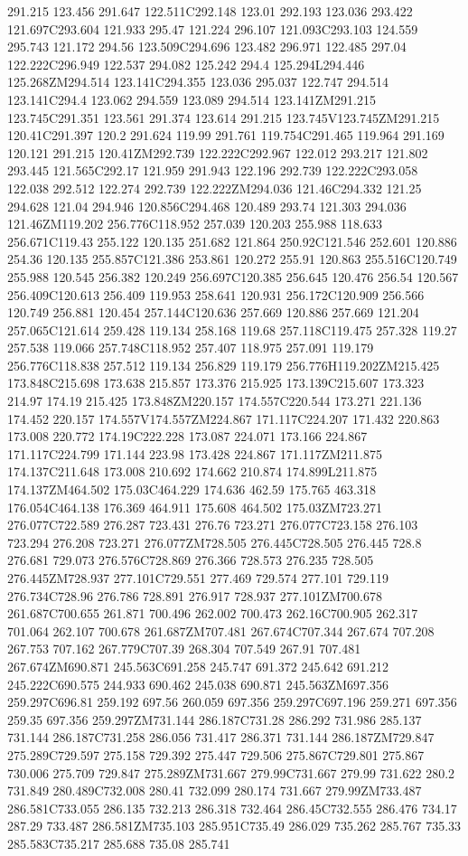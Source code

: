 291.215 123.456 291.647 122.511C292.148 123.01 292.193 123.036 293.422 121.697C293.604 121.933 295.47 121.224 296.107 121.093C293.103 124.559 295.743 121.172 294.56 123.509C294.696 123.482 296.971 122.485 297.04 122.222C296.949 122.537 294.082 125.242 294.4 125.294L294.446 125.268ZM294.514 123.141C294.355 123.036 295.037 122.747 294.514 123.141C294.4 123.062 294.559 123.089 294.514 123.141ZM291.215 123.745C291.351 123.561 291.374 123.614 291.215 123.745V123.745ZM291.215 120.41C291.397 120.2 291.624 119.99 291.761 119.754C291.465 119.964 291.169 120.121 291.215 120.41ZM292.739 122.222C292.967 122.012 293.217 121.802 293.445 121.565C292.17 121.959 291.943 122.196 292.739 122.222C293.058 122.038 292.512 122.274 292.739 122.222ZM294.036 121.46C294.332 121.25 294.628 121.04 294.946 120.856C294.468 120.489 293.74 121.303 294.036 121.46ZM119.202 256.776C118.952 257.039 120.203 255.988 118.633 256.671C119.43 255.122 120.135 251.682 121.864 250.92C121.546 252.601 120.886 254.36 120.135 255.857C121.386 253.861 120.272 255.91 120.863 255.516C120.749 255.988 120.545 256.382 120.249 256.697C120.385 256.645 120.476 256.54 120.567 256.409C120.613 256.409 119.953 258.641 120.931 256.172C120.909 256.566 120.749 256.881 120.454 257.144C120.636 257.669 120.886 257.669 121.204 257.065C121.614 259.428 119.134 258.168 119.68 257.118C119.475 257.328 119.27 257.538 119.066 257.748C118.952 257.407 118.975 257.091 119.179 256.776C118.838 257.512 119.134 256.829 119.179 256.776H119.202ZM215.425 173.848C215.698 173.638 215.857 173.376 215.925 173.139C215.607 173.323 214.97 174.19 215.425 173.848ZM220.157 174.557C220.544 173.271 221.136 174.452 220.157 174.557V174.557ZM224.867 171.117C224.207 171.432 220.863 173.008 220.772 174.19C222.228 173.087 224.071 173.166 224.867 171.117C224.799 171.144 223.98 173.428 224.867 171.117ZM211.875 174.137C211.648 173.008 210.692 174.662 210.874 174.899L211.875 174.137ZM464.502 175.03C464.229 174.636 462.59 175.765 463.318 176.054C464.138 176.369 464.911 175.608 464.502 175.03ZM723.271 276.077C722.589 276.287 723.431 276.76 723.271 276.077C723.158 276.103 723.294 276.208 723.271 276.077ZM728.505 276.445C728.505 276.445 728.8 276.681 729.073 276.576C728.869 276.366 728.573 276.235 728.505 276.445ZM728.937 277.101C729.551 277.469 729.574 277.101 729.119 276.734C728.96 276.786 728.891 276.917 728.937 277.101ZM700.678 261.687C700.655 261.871 700.496 262.002 700.473 262.16C700.905 262.317 701.064 262.107 700.678 261.687ZM707.481 267.674C707.344 267.674 707.208 267.753 707.162 267.779C707.39 268.304 707.549 267.91 707.481 267.674ZM690.871 245.563C691.258 245.747 691.372 245.642 691.212 245.222C690.575 244.933 690.462 245.038 690.871 245.563ZM697.356 259.297C696.81 259.192 697.56 260.059 697.356 259.297C697.196 259.271 697.356 259.35 697.356 259.297ZM731.144 286.187C731.28 286.292 731.986 285.137 731.144 286.187C731.258 286.056 731.417 286.371 731.144 286.187ZM729.847 275.289C729.597 275.158 729.392 275.447 729.506 275.867C729.801 275.867 730.006 275.709 729.847 275.289ZM731.667 279.99C731.667 279.99 731.622 280.2 731.849 280.489C732.008 280.41 732.099 280.174 731.667 279.99ZM733.487 286.581C733.055 286.135 732.213 286.318 732.464 286.45C732.555 286.476 734.17 287.29 733.487 286.581ZM735.103 285.951C735.49 286.029 735.262 285.767 735.33 285.583C735.217 285.688 735.08 285.741 